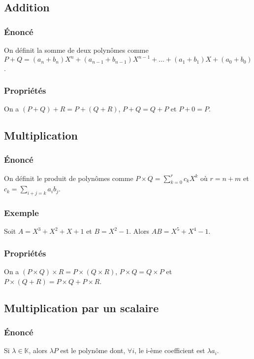 \documentclass[a4paper,10pt]{book} %
\newcommand{\K}{\mathbb{K}}
\begin{document}
\subsection{Addition}
\subsubsection{Énoncé}
On définit la somme de deux polynômes comme\\
$P+Q=(a_{n}+b_{n})X^{n}+(a_{n-1}+b_{n-1})X^{n-1}+...+(a_{1}+b_{1})X+(a_{0}+b_{0})$.

\subsubsection{Propriétés}
On a $(P+Q)+R=P+(Q+R)$, $P+Q=Q+P$ et $P+0=P$.\\

\subsection{Multiplication}
\subsubsection{Énoncé}
On définit le produit de polynômes comme $P\times Q=\sum\limits_{k=0}^{r}c_{k}X^{k}$ où $r=n+m$ et $c_{k}=\sum\limits_{i+j=k}a_{i}b_{j}$.

\subsubsection{Exemple}
Soit $A=X^{3}+X^{2}+X+1$ et $B=X^{2}-1$. Alors $AB=X^{5}+X^{4}-1$.

\subsubsection{Propriétés}
On a $(P\times Q)\times R=P\times (Q\times R)$, $P\times Q=Q\times P$ et $P\times (Q+R)=P\times Q + P\times R$.\\

\subsection{Multiplication par un scalaire}
\subsubsection{Énoncé}
Si $\lambda \in \K$, alors $\lambda P$ est le polynôme dont, $ \forall i$, le i-ème coefficient est $\lambda a_{i}$.
\end{document}

